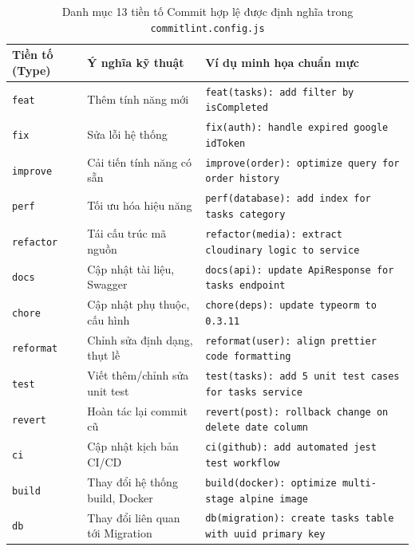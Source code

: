\documentclass[12pt,a4paper,oneside]{book}
\begin{document}
\begin{table}[htbp]
  \centering
  \small
  \caption{Danh mục 13 tiền tố Commit hợp lệ được định nghĩa trong \texttt{commitlint.config.js}}
  \label{tab:commit-types}
  \begin{tabularx}{\textwidth}{p{2.5cm} p{4.2cm} X}
    \toprule
    \textbf{Tiền tố (Type)} & \textbf{Ý nghĩa kỹ thuật} & \textbf{Ví dụ minh họa chuẩn mực} \\
    \midrule
    \texttt{feat} & Thêm tính năng mới & \texttt{feat(tasks): add filter by isCompleted} \\
    \texttt{fix} & Sửa lỗi hệ thống & \texttt{fix(auth): handle expired google idToken} \\
    \texttt{improve} & Cải tiến tính năng có sẵn & \texttt{improve(order): optimize query for order history} \\
    \texttt{perf} & Tối ưu hóa hiệu năng & \texttt{perf(database): add index for tasks category} \\
    \texttt{refactor} & Tái cấu trúc mã nguồn & \texttt{refactor(media): extract cloudinary logic to service} \\
    \texttt{docs} & Cập nhật tài liệu, Swagger & \texttt{docs(api): update ApiResponse for tasks endpoint} \\
    \texttt{chore} & Cập nhật phụ thuộc, cấu hình & \texttt{chore(deps): update typeorm to 0.3.11} \\
    \texttt{reformat} & Chỉnh sửa định dạng, thụt lề & \texttt{reformat(user): align prettier code formatting} \\
    \texttt{test} & Viết thêm/chỉnh sửa unit test & \texttt{test(tasks): add 5 unit test cases for tasks service} \\
    \texttt{revert} & Hoàn tác lại commit cũ & \texttt{revert(post): rollback change on delete date column} \\
    \texttt{ci} & Cập nhật kịch bản CI/CD & \texttt{ci(github): add automated jest test workflow} \\
    \texttt{build} & Thay đổi hệ thống build, Docker & \texttt{build(docker): optimize multi-stage alpine image} \\
    \texttt{db} & Thay đổi liên quan tới Migration & \texttt{db(migration): create tasks table with uuid primary key} \\
    \bottomrule
  \end{tabularx}
\end{table}
\end{document}
